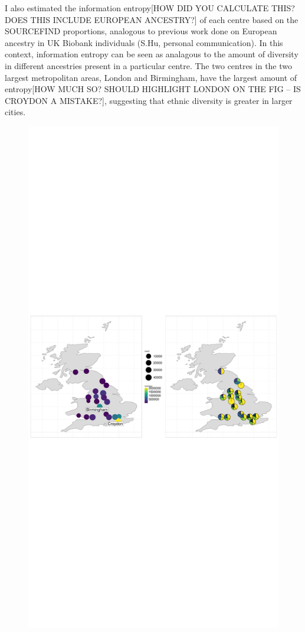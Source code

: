 {I also estimated the information entropy{\color{red}[HOW DID YOU CALCULATE THIS? DOES THIS INCLUDE EUROPEAN ANCESTRY?]} of each centre based on the SOURCEFIND proportions, {\color{red}analogous to previous work done on European ancestry in UK Biobank individuals (S.Hu, personal communication)}. In this context, information entropy can be seen as analagous to the amount of diversity in different ancestries present in a particular centre. The two centres in the two largest metropolitan areas, London and Birmingham, have the largest amount of entropy{\color{red}[HOW MUCH SO? SHOULD HIGHLIGHT LONDON ON THE FIG -- IS CROYDON A MISTAKE?]}, suggesting that ethnic diversity is greater in larger cities.

\begin{figure}
    \centering
    \includegraphics[width=1.0\textwidth]{../images/chapter3/SF_props_pie_chart.pdf}

\end{figure}}
